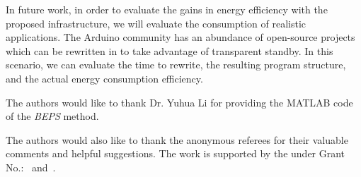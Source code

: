 In future work, in order to evaluate the gains in energy efficiency with the
proposed infrastructure, we will evaluate the consumption of realistic
applications.
%
The Arduino community has an abundance of open-source projects which can be
rewritten in \CEU to take advantage of transparent standby.
%
In this scenario, we can evaluate the time to rewrite, the resulting program
structure, and the actual energy consumption efficiency.

\begin{acks}
  The authors would like to thank Dr. Yuhua Li for providing the
  MATLAB code of the \textit{BEPS} method.

  The authors would also like to thank the anonymous referees for
  their valuable comments and helpful suggestions. The work is
  supported by the  under Grant
  No.:~
  and~.

\end{acks}
